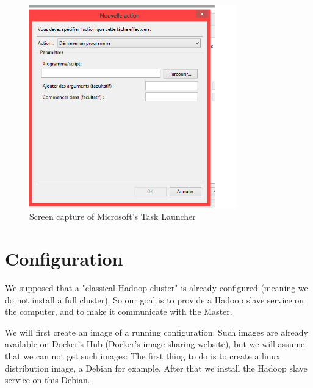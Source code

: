 \documentclass[11pt]{report} %
\begin{document}
\begin{figure}[ht!]
\centering
\includegraphics[width=90mm]{screen.png}
\caption{Screen capture of Microsoft's Task Launcher \label{overflow}}
\end{figure}

\section{Configuration}
We supposed that a "classical Hadoop cluster" is already configured (meaning we do not install a full cluster). So our goal is to provide a Hadoop slave service on the computer, and to make it communicate with the Master.

We will first create an image of a running configuration. Such images are already available on Docker's Hub (Docker's image sharing website), but we will assume that we can not get such images: 
The first thing to do is to create a linux distribution image, a Debian for example. After that we install the Hadoop slave service on this Debian.
\end{document}

